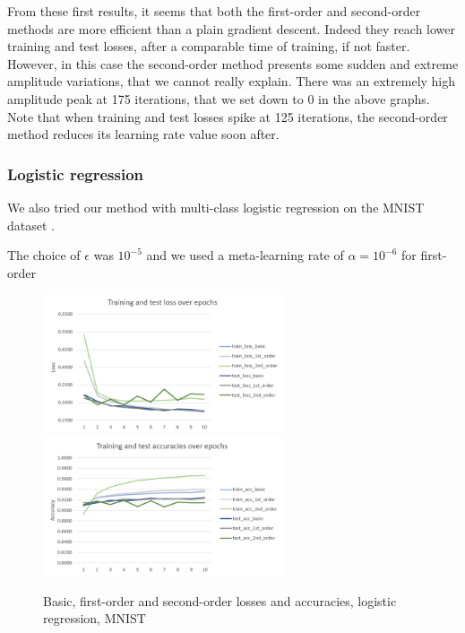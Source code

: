 \documentclass{article}
\begin{document}
  From these first results, it seems that both the first-order and second-order methods are more efficient than a plain gradient descent. Indeed they reach lower training and test losses, after a comparable time of training, if not faster. However, in this case the second-order method presents some sudden and extreme amplitude variations, that we cannot really explain. There was an extremely high amplitude peak at 175 iterations, that we set down to 0 in the above graphs. Note that when training and test losses spike at 125 iterations, the second-order method reduces its learning rate value soon after.
  
  
  \subsubsection{Logistic regression}
  
  We also tried our method with multi-class logistic regression on the MNIST dataset \cite{xiao2017fashion}.
  
  The choice of $\epsilon$ was $10^{-5}$ and we used a meta-learning rate of $\alpha=10^{-6}$ for first-order
  \begin{figure}[!h]
	\includegraphics[width=200pt]{loss_logistic.png}
	\includegraphics[width=200pt]{acc_logistic.png}
	\caption{Basic, first-order and second-order losses and accuracies, logistic regression, MNIST}
  \end{figure}  
\end{document}
